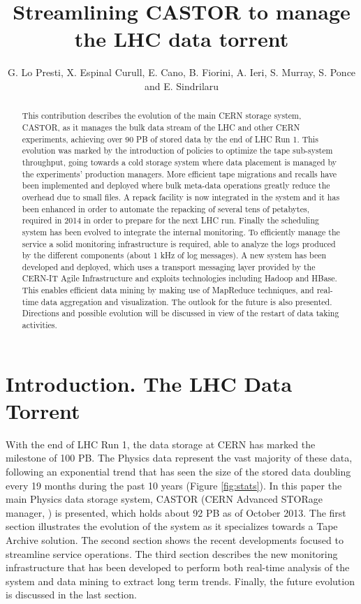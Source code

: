 \documentclass[a4paper]{jpconf}
\begin{document}
\title{Streamlining CASTOR to manage the LHC data torrent}

\author{G. Lo Presti, X. Espinal Curull, E. Cano, B. Fiorini, A. Ieri, S. Murray, S. Ponce and E. Sindrilaru}

\address{CERN, 1211 Geneva 23, Switzerland}



\begin{abstract}
This contribution describes the evolution of the main CERN storage system, CASTOR, as it manages the bulk data stream of the LHC and other CERN experiments, achieving over 90 PB of stored data by the end of LHC Run 1.
This evolution was marked by the introduction of policies to optimize the tape sub-system throughput, going towards a cold storage system where data placement is managed by the experiments' production managers. More efficient tape migrations and recalls have been implemented and deployed where bulk meta-data operations greatly reduce the overhead due to small files. A repack facility is now integrated in the system and it has been enhanced in order to automate the repacking of several tens of petabytes, required in 2014 in order to prepare for the next LHC run. Finally the scheduling system has been evolved to integrate the internal monitoring.
To efficiently manage the service a solid monitoring infrastructure is required, able to analyze the logs produced by the different components (about 1 kHz of log messages). A new system has been developed and deployed, which uses a transport messaging layer provided by the CERN-IT Agile Infrastructure and exploits technologies including Hadoop and HBase. This enables efficient data mining by making use of MapReduce techniques, and real-time data aggregation and visualization.
The outlook for the future is also presented. Directions and possible evolution will be discussed in view of the restart of data taking activities.
\end{abstract}


\section{Introduction. The LHC Data Torrent}

With the end of LHC Run 1, the data storage at CERN has marked the milestone of 100 PB. The Physics data represent the vast majority of these data, following an exponential trend that has seen the size of the stored data doubling every 19 months during the past 10 years (Figure \ref{fig:stats}). In this paper the main Physics data storage system, CASTOR (CERN Advanced STORage manager, \cite{castor}) is presented, which holds about 92 PB as of October 2013. The first section illustrates the evolution of the system as it specializes towards a Tape Archive solution. The second section shows the recent developments focused to streamline  service operations. The third section describes the new monitoring infrastructure that has been developed to perform  both real-time analysis of the system and data mining to extract long term trends. Finally, the future evolution is discussed in the last section.
\end{document}
